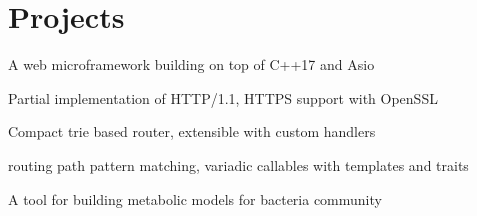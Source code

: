 \documentclass[]{deedy-resume-openfont}
\begin{document}
\begin{minipage}[t]{0.66\textwidth}
    \section{Projects} 

    \begin{small}
        \begin{tightemize}
            \item A web microframework building on top of C++17 and Asio
            \item Partial implementation of HTTP/1.1, HTTPS support with OpenSSL
            \item Compact trie based router, extensible with custom handlers
            \item routing path pattern matching, variadic callables with templates and traits 
        \end{tightemize}
    \end{small}
    \sectionsep 
    
    \begin{small}
        \begin{tightemize}
            \item A tool for building metabolic models for bacteria community
        \end{tightemize}
    \end{small}
    \sectionsep 


    

\end{minipage}
\end{document}
